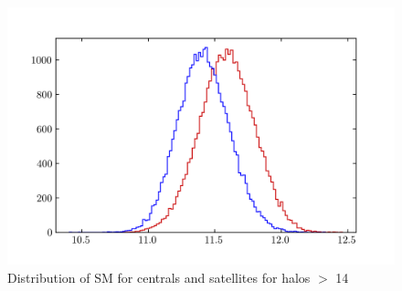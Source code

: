\documentclass{article}
\begin{document}
\begin{figure}[h]
    \includegraphics[width=\textwidth]{images/mag_gap2.png}
    \caption{Distribution of SM for centrals and satellites for halos $>$ 14}
\end{figure}



\end{document}
